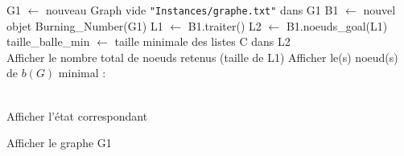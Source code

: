 \documentclass[11pt,a4paper]{article}
\begin{document}
\begin{tcolorbox}[title=Programme principal,colback=gray!10!white,colframe=gray!95!black]
\begin{algorithm}[H]
\begin{algorithmic}[1]

    \State G1 $\gets$ nouveau Graph vide
    \State \texttt{"Instances/graphe.txt"} dans G1
    \State B1 $\gets$ nouvel objet Burning\_Number(G1)
    \State L1 $\gets$ B1.traiter()
    \State L2 $\gets$ B1.noeuds\_goal(L1)
    \State taille\_balle\_min $\gets$ taille minimale des listes C dans L2
	\\

    \State Afficher le nombre total de noeuds retenus (taille de L1)
    \State Afficher le(s) noeud(s) de $b(G)$ minimal :
    
    \\
            \State Afficher l'état correspondant
        \EndIf
    \EndFor

    \State Afficher le graphe G1

\end{algorithmic}
\end{algorithm}
\end{tcolorbox}
\end{document}
